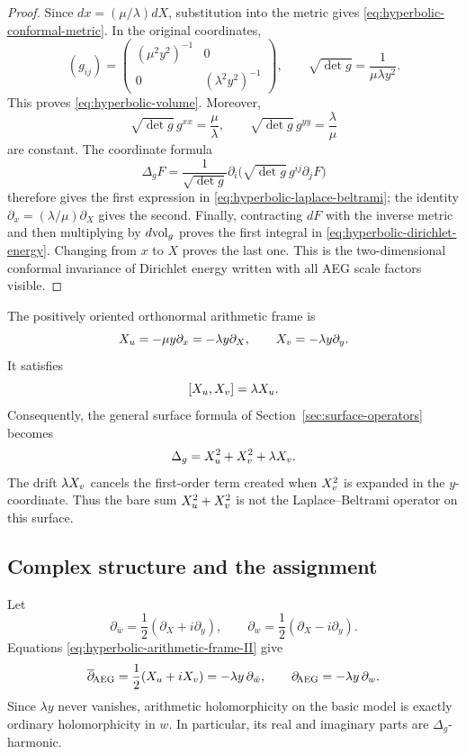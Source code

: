 \begin{proof}
Since $dx=(\mu/\lambda)dX$, substitution into the metric gives
\eqref{eq:hyperbolic-conformal-metric}.  In the original coordinates,
\[
 (g_{ij})=
 \begin{pmatrix}
  (\mu^2y^2)^{-1}&0\\
  0&(\lambda^2y^2)^{-1}
 \end{pmatrix},
 \qquad
 \sqrt{\det g}=\frac1{\mu\lambda y^2}.
\]
This proves \eqref{eq:hyperbolic-volume}.  Moreover,
\[
 \sqrt{\det g}\,g^{xx}=\frac{\mu}{\lambda},
 \qquad
 \sqrt{\det g}\,g^{yy}=\frac{\lambda}{\mu}
\]
are constant.  The coordinate formula
\[
 \Delta_gF
 =\frac1{\sqrt{\det g}}
   \partial_i\bigl(\sqrt{\det g}\,g^{ij}\partial_jF\bigr)
\]
therefore gives the first expression in
\eqref{eq:hyperbolic-laplace-beltrami}; the identity
$\partial_x=(\lambda/\mu)\partial_X$ gives the second.  Finally,
contracting $dF$ with the inverse metric and then multiplying by
$d\mathrm{vol}_g$ proves the first integral in
\eqref{eq:hyperbolic-dirichlet-energy}.  Changing from $x$ to $X$ proves the
last one.  This is the two-dimensional conformal invariance of Dirichlet
energy written with all AEG scale factors visible.
\end{proof}

The positively oriented orthonormal arithmetic frame is
\begin{equation}\label{eq:hyperbolic-arithmetic-frame-II}
 X_u=-\mu y\partial_x=-\lambda y\partial_X,
 \qquad
 X_v=-\lambda y\partial_y.
\end{equation}
It satisfies
\begin{equation}\label{eq:hyperbolic-frame-bracket-II}
 [X_u,X_v]=\lambda X_u.
\end{equation}
Consequently, the general surface formula of
Section~\ref{sec:surface-operators} becomes
\begin{equation}\label{eq:hyperbolic-laplacian-frame}
 \Delta_g=X_u^2+X_v^2+\lambda X_v.
\end{equation}
The drift $\lambda X_v$ cancels the first-order term created when $X_v^2$
is expanded in the $y$-coordinate.  Thus the bare sum
$X_u^2+X_v^2$ is not the Laplace--Beltrami operator on this surface.

\subsection{Complex structure and the assignment}

Let
\[
 \partial_{\bar w}=\frac12(\partial_X+i\partial_y),
 \qquad
 \partial_w=\frac12(\partial_X-i\partial_y).
\]
Equations \eqref{eq:hyperbolic-arithmetic-frame-II} give
\begin{equation}\label{eq:hyperbolic-dbar-coordinate}
 \overline\partial_{\!\mathrm{AEG}}
 =\frac12(X_u+iX_v)
 =-\lambda y\,\partial_{\bar w},
 \qquad
 \partial_{\!\mathrm{AEG}}=-\lambda y\,\partial_w.
\end{equation}
Since $\lambda y$ never vanishes, arithmetic holomorphicity on the basic
model is exactly ordinary holomorphicity in $w$.  In particular, its real and
imaginary parts are $\Delta_g$-harmonic.


